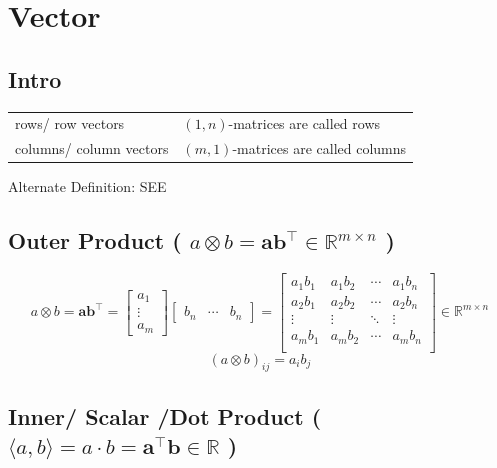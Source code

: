 \chapter{Vector \cite{mfml-1}}\label{chapter: Vector}

\section*{Intro \cite{mfml-1}}
\begin{table}[H]
    \begin{tabular}{l l}
        rows/ row vectors & $(1, n)$-matrices are called rows \\

        columns/ column vectors & $(m, 1)$-matrices are called columns \\
    \end{tabular}
\end{table}

Alternate Definition: SEE 


\section{Outer Product ( $a\otimes b= \mathbf{ab^\top} \in \mathbb{R}^{m\times n}$ ) \cite{mfml-1}} \label{vector: Outer Product}
\[
    a\otimes b= \mathbf{ab^\top} = 
    \begin{bmatrix}
        a_1\\
        \vdots\\
        a_m
    \end{bmatrix}
    \begin{bmatrix}
        b_n & \cdots & b_n
    \end{bmatrix}
    =
    \begin{bmatrix}
        a_1 b_1 & a_1 b_2 & \cdots & a_1 b_n\\
        a_2 b_1 & a_2 b_2 & \cdots & a_2 b_n\\
        \vdots & \vdots & \ddots & \vdots \\
        a_m b_1 & a_m b_2 & \cdots & a_m b_n\\
    \end{bmatrix} \in \mathbb{R}^{m\times n}
\]
\[
    (a\otimes b)_{ij} = a_i b_j
\]

\section{Inner/ Scalar /Dot Product ( $\langle a, b \rangle =a\cdot b = \mathbf{a^\top b} \in \mathbb{R}$ ) \cite{mfml-1,wiki/Dot_product}} \label{vector: Inner/ Scalar /Dot Product}


